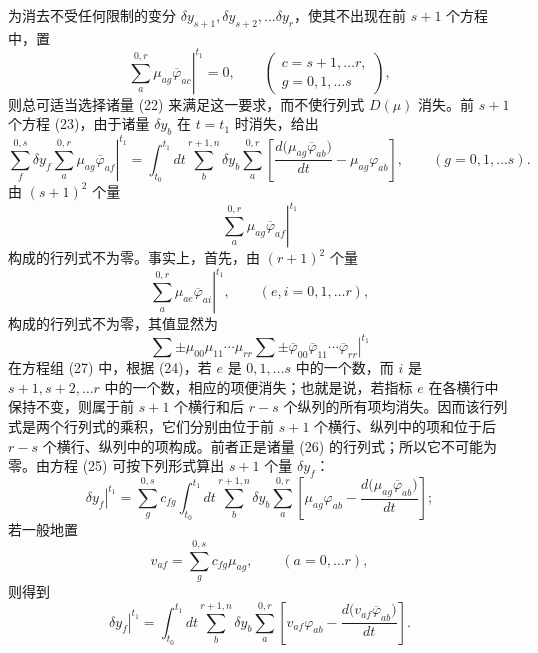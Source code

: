 \documentclass[11pt,a4paper,leqno]{article}
\begin{document}
为消去不受任何限制的变分 $\delta y_{s+1},\delta y_{s+2},\ldots\delta y_r$，使其不出现在前 $s+1$ 个方程中，置
\begin{equation}\tag{24}
\left.\sum_a^{0,r}\mu_{ag}\overline{\varphi}_{ac}\right|^{t_1}=0,
\qquad
\left(
\begin{gathered}
c=s+1,\ldots r,\\
g=0,1,\ldots s
\end{gathered}
\right),
\end{equation}
则总可适当选择诸量 (22) 来满足这一要求，而不使行列式 $D(\mu)$ 消失。前 $s+1$ 个方程 (23)，由于诸量 $\delta y_b$ 在 $t=t_1$ 时消失，给出
\begin{equation}\tag{25}
\left.
\sum_f^{0,s}\delta y_f\sum_a^{0,r}\mu_{ag}\overline{\varphi}_{af}
\right|^{t_1}
=
\int_{t_0}^{t_1}dt\sum_b^{r+1,n}\delta y_b\sum_a^{0,r}
\left[
\frac{d\bigl(\mu_{ag}\overline{\varphi}_{ab}\bigr)}{dt}
-\mu_{ag}\varphi_{ab}
\right],
\qquad(g=0,1,\ldots s).
\end{equation}
由 $(s+1)^2$ 个量
\begin{equation}\tag{26}
\left.\sum_a^{0,r}\mu_{ag}\overline{\varphi}_{af}\right|^{t_1}
\end{equation}
构成的行列式不为零。事实上，首先，由 $(r+1)^2$ 个量
\begin{equation}\tag{27}
\left.\sum_a^{0,r}\mu_{ae}\overline{\varphi}_{ai}\right|^{t_1},
\qquad(e,i=0,1,\ldots r),
\end{equation}
构成的行列式不为零，其值显然为
\[
\left.
\sum\mathord{\pm}\mu_{00}\mu_{11}\cdots\mu_{rr}
\sum\mathord{\pm}\overline{\varphi}_{00}\overline{\varphi}_{11}\cdots
\overline{\varphi}_{rr}
\right|^{t_1}
\]
在方程组 (27) 中，根据 (24)，若 $e$ 是 $0,1,\ldots s$ 中的一个数，而 $i$ 是 $s+1,s+2,\ldots r$ 中的一个数，相应的项便消失；也就是说，若指标 $e$ 在各横行中保持不变，则属于前 $s+1$ 个横行和后 $r-s$ 个纵列的所有项均消失。因而该行列式是两个行列式的乘积，它们分别由位于前 $s+1$ 个横行、纵列中的项和位于后 $r-s$ 个横行、纵列中的项构成。前者正是诸量 (26) 的行列式；所以它不可能为零。由方程 (25) 可按下列形式算出 $s+1$ 个量 $\delta y_f$：
\[
\left.\delta y_f\right|^{t_1}
=
\sum_g^{0,s}c_{fg}\int_{t_0}^{t_1}dt\sum_b^{r+1,n}\delta y_b\sum_a^{0,r}
\left[
\mu_{ag}\varphi_{ab}-\frac{d\bigl(\mu_{ag}\overline{\varphi}_{ab}\bigr)}{dt}
\right];
\]
若一般地置
\[
v_{af}=\sum_g^{0,s}c_{fg}\mu_{ag},
\qquad(a=0,\ldots r),
\]
则得到
\begin{equation}\tag{28}
\left.\delta y_f\right|^{t_1}
=
\int_{t_0}^{t_1}dt\sum_b^{r+1,n}\delta y_b\sum_a^{0,r}
\left[
v_{af}\varphi_{ab}-\frac{d\bigl(v_{af}\overline{\varphi}_{ab}\bigr)}{dt}
\right].
\end{equation}
\end{document}
